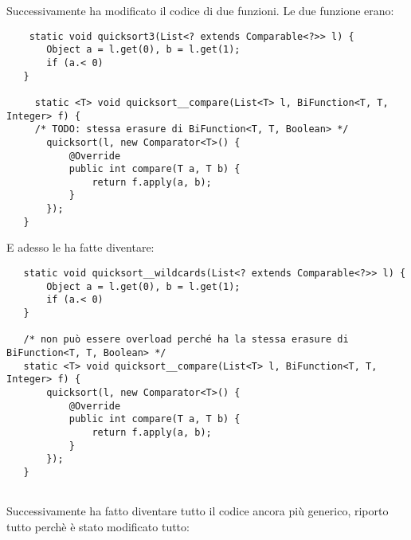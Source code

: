 \noindent Successivamente ha modificato il codice di due funzioni. Le due funzione erano:
\begin{lstlisting}
    static void quicksort3(List<? extends Comparable<?>> l) {
       Object a = l.get(0), b = l.get(1);
       if (a.< 0)
   }

     static <T> void quicksort__compare(List<T> l, BiFunction<T, T, Integer> f) { 
     /* TODO: stessa erasure di BiFunction<T, T, Boolean> */
       quicksort(l, new Comparator<T>() {
           @Override
           public int compare(T a, T b) {
               return f.apply(a, b);
           }
       });
   }  
\end{lstlisting}

\noindent E adesso le ha fatte diventare:
\begin{lstlisting}
   static void quicksort__wildcards(List<? extends Comparable<?>> l) {
       Object a = l.get(0), b = l.get(1);
       if (a.< 0)
   }
    
   /* non può essere overload perché ha la stessa erasure di BiFunction<T, T, Boolean> */
   static <T> void quicksort__compare(List<T> l, BiFunction<T, T, Integer> f) {
       quicksort(l, new Comparator<T>() {
           @Override
           public int compare(T a, T b) {
               return f.apply(a, b);
           }
       });
   } 
 
\end{lstlisting}
\noindent Successivamente ha fatto diventare tutto il codice ancora più generico, riporto tutto perchè è stato modificato tutto:
